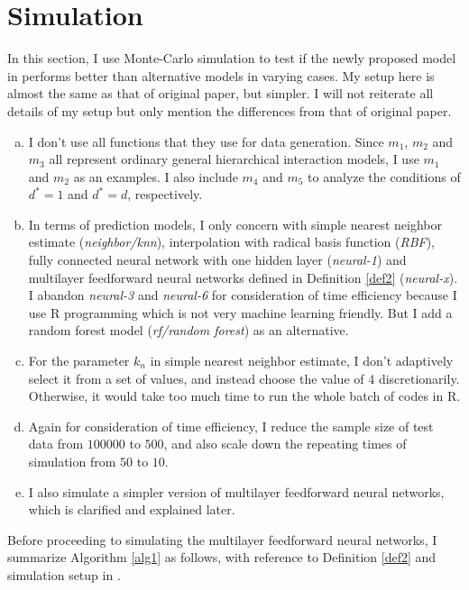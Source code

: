 \section{Simulation}
\label{sec:simulation}

In this section, I use Monte-Carlo simulation to test if the newly proposed model in \cite{Bauer2019} performs better than alternative models in varying cases. My setup here is almost the same as that of original paper, but simpler. I will not reiterate all details of my setup but only mention the differences from that of original paper.

\begin{enumerate}[(a)]
    \item I don't use all functions that they use for data generation. Since $m_1$, $m_2$ and $m_3$ all represent ordinary general hierarchical interaction models, I use $m_1$ and $m_2$ as an examples. I also include $m_4$ and $m_5$ to analyze the conditions of $d^*=1$ and $d^*=d$, respectively.
    \item In terms of prediction models, I only concern with simple nearest neighbor estimate (\textit{neighbor/knn}), interpolation with radical basis function (\textit{RBF}), fully connected neural network with one hidden layer (\textit{neural-1}) and multilayer feedforward neural networks defined in Definition \ref{def2} (\textit{neural-x}). I abandon \textit{neural-3} and \textit{neural-6} for consideration of time efficiency because I use R programming which is not very machine learning friendly. But I add a random forest model (\textit{rf/random forest}) as an alternative.
    \item For the parameter $k_n$ in simple nearest neighbor estimate, I don't adaptively select it from a set of values, and instead choose the value of 4 discretionarily. Otherwise, it would take too much time to run the whole batch of codes in R.
    \item Again for consideration of time efficiency, I reduce the sample size of test data from $100000$ to $500$, and also scale down the repeating times of simulation from $50$ to $10$.
    \item I also simulate a simpler version of multilayer feedforward neural networks, which is clarified and explained later.
\end{enumerate}

Before proceeding to simulating the multilayer feedforward neural networks, I summarize Algorithm \ref{alg1} as follows, with reference to Definition \ref{def2} and simulation setup in \cite{Bauer2019}.


